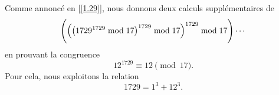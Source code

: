 \noindent%
Comme annoncé en [\ref{1.29}], nous donnons deux calculs supplémentaires de
%
\begin{equation*}
  \Biggl(\Bigl(\bigl(1729^{1729} \bmod{17}\bigr)^{1729} \bmod{17}\Bigr)^{1729} \bmod{17}\Biggr) \cdots
\end{equation*}
%
en prouvant la congruence
%
\begin{equation*}
  12^{1729} \equiv 12 \pmod{17}.
\end{equation*}
%
Pour cela, nous exploitons la relation 
%
\begin{equation}
  1729 = 1^3 + 12^3.
\end{equation} 
%
